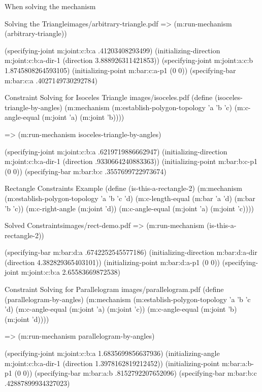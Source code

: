 When solving the mechanism

\begin{pdf-example}
[label=run-arbitrary-tri]
{Solving the Triangle}{images/arbitrary-triangle.pdf}
=> (m:run-mechanism (arbitrary-triangle))

(specifying-joint m:joint:c:b:a .41203408293499)
(initializing-direction m:joint:c:b:a-dir-1 (direction 3.888926311421853))
(specifying-joint m:joint:a:c:b 1.8745808264593105)
(initializing-point m:bar:c:a-p1 (0 0))
(specifying-bar m:bar:c:a .4027149730292784)
\end{pdf-example}


\begin{pdf-example}{Constraint Solving for Isoceles Triangle}
{images/isoceles.pdf}
(define (isoceles-triangle-by-angles)
  (m:mechanism
   (m:establish-polygon-topology 'a 'b 'c)
   (m:c-angle-equal (m:joint 'a)
                    (m:joint 'b))))

=> (m:run-mechanism  isoceles-triangle-by-angles)

(specifying-joint m:joint:c:b:a .6219719886662947)
(initializing-direction m:joint:c:b:a-dir-1 (direction .9330664240883363))
(initializing-point m:bar:b:c-p1 (0 0))
(specifying-bar m:bar:b:c .3557699722973674)
\end{pdf-example}

\begin{code-example}
{Rectangle Constraints Example}
(define (is-this-a-rectangle-2)
  (m:mechanism
   (m:establish-polygon-topology 'a 'b 'c 'd)
   (m:c-length-equal (m:bar 'a 'd)
                     (m:bar 'b 'c))
   (m:c-right-angle (m:joint 'd))
   (m:c-angle-equal (m:joint 'a)
                    (m:joint 'c))))
\end{code-example}

\begin{pdf-example}{Solved Constraints}{images/rect-demo.pdf}
=> (m:run-mechanism (is-this-a-rectangle-2))

(specifying-bar m:bar:d:a .6742252545577186)
(initializing-direction m:bar:d:a-dir (direction 4.382829365403101))
(initializing-point m:bar:d:a-p1 (0 0))
(specifying-joint m:joint:c:b:a 2.65583669872538)
\end{pdf-example}

\begin{pdf-example}{Constraint Solving for Parallelogram}
{images/parallelogram.pdf}
(define (parallelogram-by-angles)
  (m:mechanism
   (m:establish-polygon-topology 'a 'b 'c 'd)
   (m:c-angle-equal (m:joint 'a)
                    (m:joint 'c))
   (m:c-angle-equal (m:joint 'b)
                    (m:joint 'd))))

=> (m:run-mechanism parallelogram-by-angles)

(specifying-joint m:joint:c:b:a 1.6835699856637936)
(initializing-angle m:joint:c:b:a-dir-1 (direction 1.3978162819212452))
(initializing-point m:bar:a:b-p1 (0 0))
(specifying-bar m:bar:a:b .8152792207652096)
(specifying-bar m:bar:b:c .42887899934327023)
\end{pdf-example}

